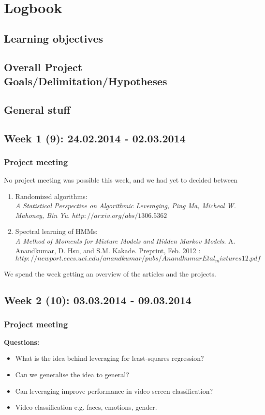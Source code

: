\section{Logbook}

\subsection*{Learning objectives}

\subsection*{Overall Project Goals/Delimitation/Hypotheses}

\subsection*{General stuff}



\subsection*{Week 1 (9): 24.02.2014 - 02.03.2014}
\subsubsection*{Project meeting}
No project meeting was possible this week, and we had yet to decided between 
\begin{enumerate}
\item Randomized algorithms: \\
\emph{A Statistical Perspective on Algorithmic Leveraging, Ping Ma, Micheal W. Mahoney, Bin Yu}.  $http://arxiv.org/abs/1306.5362$
\item Spectral learning of HMMs:\\
\emph{A Method of Moments for Mixture Models and Hidden Markov Models}. A. Anandkumar, D. Hsu, and S.M. Kakade. Preprint, Feb. 2012 : $http://newport.eecs.uci.edu/anandkumar/pubs/AnandkumarEtal_mixtures12.pdf$
\end{enumerate}

We spend the week getting an overview of the articles and the projects.

\subsection*{Week 2 (10): 03.03.2014 - 09.03.2014}
\subsubsection*{Project meeting}
\textbf{Questions:}\\
\begin{itemize}
\item What is the idea behind leveraging for least-squares regression?
\item Can we generalise the idea to general?
\item Can leveraging improve performance in video screen classification?
\item Video classification e.g. faces, emotions, gender.
\end{itemize}


